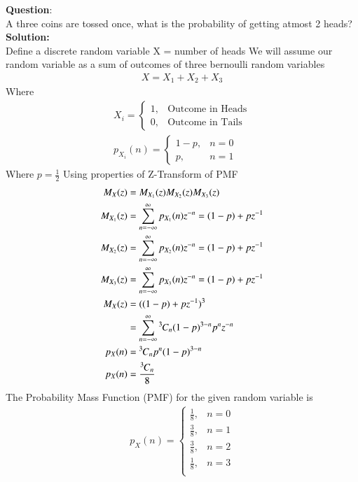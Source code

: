 \documentclass[journal]{IEEEtran}
\begin{document}
\textbf{Question}:\\
A three coins are tossed once, what is the probability of getting atmost 2 heads?
\\
\textbf{Solution: }\\
Define a discrete random variable X = number of heads\newline
We will assume our random variable as a sum of outcomes of three bernoulli random variables
\begin{align}
	X = X_1+X_2+X_3
\end{align}
Where
\begin{align}
X_i = 
\begin{cases}
	1, & \text{Outcome in Heads}\\
	0, & \text{Outcome in Tails}
\end{cases}\\
p_{X_i}(n) = 
\begin{cases}
	1-p, & n = 0\\
	p, & n = 1
\end{cases}
\end{align}
Where $p=\frac{1}{2}$\newline
Using properties of Z-Transform of PMF
\begin{align}
	M_X(z) &= M_{X_1}(z)M_{X_2}(z)M_{X_3}(z)\\
	M_{X_1}(z) &= \sum_{n=-\infty}^{\infty}p_{X_1}(n)z^{-n} = (1-p)+pz^{-1}\\
	M_{X_2}(z) &= \sum_{n=-\infty}^{\infty}p_{X_2}(n)z^{-n} = (1-p)+pz^{-1}\\
	M_{X_3}(z) &= \sum_{n=-\infty}^{\infty}p_{X_3}(n)z^{-n} = (1-p)+pz^{-1}\\
	M_X(z) &= ((1-p)+pz^{-1})^3\\
	 &= \sum_{n=-\infty}^{\infty}{{}^{3}\mkern-1muC_{n}}(1-p)^{3-n}p^nz^{-n}\\
	p_{X}(n) &= {{}^{3}\mkern-1muC_{n}}p^{n}(1-p)^{3-n}\\
	p_{X}(n) &= \frac{{{}^{3}\mkern-1muC_{n}}}{8}
\end{align}
The Probability Mass Function (PMF) for the given random variable is
\begin{align}
p_X(n) =
\begin{cases}
	\frac{1}{8}, & n = 0 \\
	\frac{3}{8}, & n = 1 \\
	\frac{3}{8}, & n = 2 \\
	\frac{1}{8}, & n = 3 \\
\end{cases}
\end{align}
\end{document}
